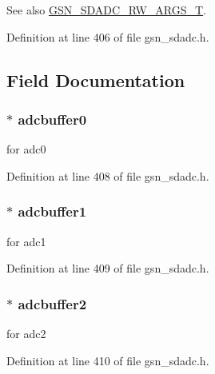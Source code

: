 \begin{DoxySeeAlso}{See also}
\hyperlink{a00652_ga9a25b59de94ab9eb590861d864697679}{GSN\_\-SDADC\_\-RW\_\-ARGS\_\-T}. 
\end{DoxySeeAlso}


Definition at line 406 of file gsn\_\-sdadc.h.



\subsection{Field Documentation}
\hypertarget{a00215_ace34805758a9affbaaae720eb90aa735}{
\subsubsection[{adcbuffer0}]{$\ast$ {\bf adcbuffer0}}}
\label{a00215_ace34805758a9affbaaae720eb90aa735}
for adc0 

Definition at line 408 of file gsn\_\-sdadc.h.

\hypertarget{a00215_a8a4f4b4f770cd2b7652dfa2310becfa3}{
\subsubsection[{adcbuffer1}]{$\ast$ {\bf adcbuffer1}}}
\label{a00215_a8a4f4b4f770cd2b7652dfa2310becfa3}
for adc1 

Definition at line 409 of file gsn\_\-sdadc.h.

\hypertarget{a00215_a4be6220f843912d59c9ceca3d9d35ea1}{
\subsubsection[{adcbuffer2}]{$\ast$ {\bf adcbuffer2}}}
\label{a00215_a4be6220f843912d59c9ceca3d9d35ea1}
for adc2 

Definition at line 410 of file gsn\_\-sdadc.h.

